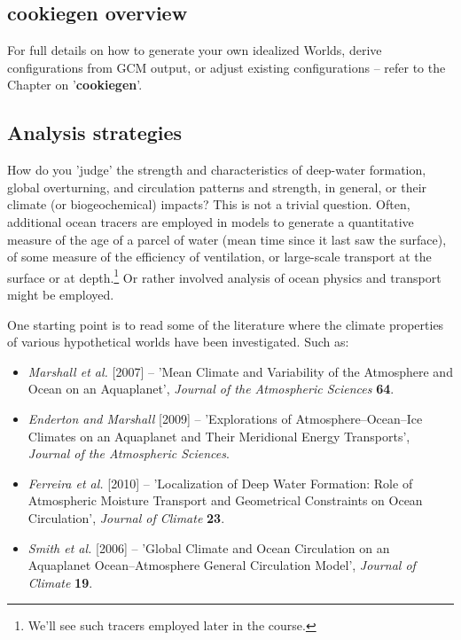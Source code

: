 \vspace{2mm}


\subsection{cookiegen overview}

For full details on how to generate your own idealized Worlds, derive configurations from GCM output, or adjust existing configurations -- refer to the Chapter on '\textbf{cookiegen}'.




\newpage

\subsection{Analysis strategies}

How do you 'judge' the strength and characteristics of deep-water formation, global overturning, and circulation patterns and strength, in general, or their climate (or biogeochemical) impacts? This is not a trivial question. Often, additional ocean tracers are employed in models to generate a quantitative measure of the age of a parcel of water (mean time since it last saw the surface), of some measure of the efficiency of ventilation, or large-scale transport at the surface or at depth.\footnote{We'll see such tracers employed later in the course.} Or rather involved analysis of ocean physics and transport might be employed.

One starting point is to read some of the literature where the climate properties of various hypothetical worlds have been investigated. Such as:
\vspace{1mm}

\begin{itemize}[noitemsep]
\item \textit{Marshall et al.} [2007] -- 'Mean Climate and Variability of the Atmosphere and Ocean on an Aquaplanet', \textit{Journal of the Atmospheric Sciences} \textbf{64}.
\item \textit{Enderton and Marshall} [2009] -- 'Explorations of Atmosphere--Ocean--Ice Climates on an Aquaplanet and Their Meridional Energy Transports', \textit{Journal of the Atmospheric Sciences}.
\item \textit{Ferreira et al.} [2010] -- 'Localization of Deep Water Formation: Role of Atmospheric Moisture Transport and Geometrical Constraints on Ocean Circulation', \textit{Journal of Climate} \textbf{23}.
\item \textit{Smith et al.} [2006] -- 'Global Climate and Ocean Circulation on an Aquaplanet Ocean–Atmosphere General Circulation Model',  \textit{Journal of Climate} \textbf{19}.
\end{itemize}

